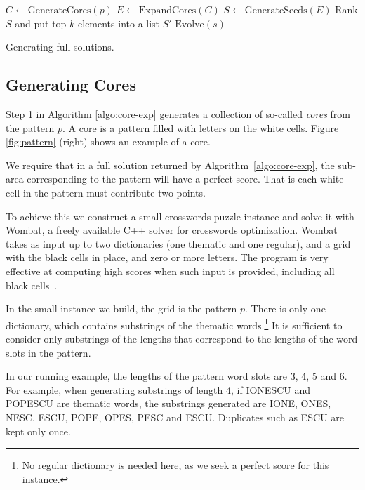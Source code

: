 \begin{algorithm}[t]
\DontPrintSemicolon %
$C \leftarrow \mbox{GenerateCores}(p)$\; \label{algl:generateCores}
$E \leftarrow \mbox{ExpandCores}(C)$\; \label{algl:expandCores}
$S \leftarrow \mbox{GenerateSeeds}(E)$\; \label{algl:generateSeeds}
Rank $S$ and put top $k$ elements into a list $S'$\; \label{algl:rankSeeds}
 {
    $\mbox{Evolve}(s)$\; \label{algl:evolveSeeds}
}
\caption{{\sc Generating full solutions.}}
\label{algo:core-exp}
\end{algorithm}


\subsection{Generating Cores}

Step 1 in Algorithm \ref{algo:core-exp} generates a collection of so-called \emph{cores} from the pattern $p$.
A core is a pattern filled with letters on the white cells.
Figure \ref{fig:pattern} (right) shows an example of a core.

We require that in a full solution returned by Algorithm~\ref{algo:core-exp}, 
the sub-area corresponding to the pattern will have a perfect score.
That is each white cell in the pattern must contribute two points.

To achieve this we construct a small crosswords puzzle instance
and solve it with 
{\sc Wombat},
a freely available C++  solver for crosswords optimization.
{\sc Wombat} takes as input up to two dictionaries (one thematic and one regular),
and a grid with the black cells in place, and zero or more letters.
The program is very effective at computing high scores when such input 
is provided, including all black cells~\cite{DBLP:conf/socs/BoteaB21,Botea_Bulitko_2022}. 

In the small instance we build,
the grid is the pattern $p$. There is only one dictionary, which contains 
substrings of the thematic words.\footnote{No regular dictionary is
needed here, as we seek a perfect score for this instance.}
It is sufficient to consider only substrings of the lengths that 
correspond to the lengths of the word slots in the pattern.

In our running example, the lengths of the pattern word slots are 3, 4, 5 and 6.
For example, when generating substrings of length 4,
if {\sf\small IONESCU} and {\sf\small POPESCU} are thematic words,
the substrings generated are {\sf\small IONE}, {\sf\small ONES}, {\sf\small NESC}, {\sf\small ESCU}, {\sf\small POPE}, {\sf\small OPES}, {\sf\small PESC} and {\sf\small ESCU}.
Duplicates such as {\sf\small ESCU} are kept only once.

